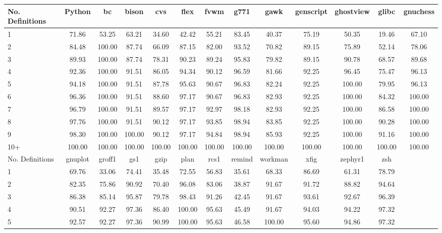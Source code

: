 \begin{tabular}{|l|c|c|c|c|c|c|c|c|c|c|c|c|}\hline
No. Definitions & Python & bc & bison & cvs & flex & fvwm & g771 & gawk & genscript & ghostview & glibc & gnuchess\\\hline\hline
1  & 71.86 & 53.25 & 63.21 & 34.60 & 42.42 & 55.21 & 83.45 & 40.37 & 75.19 & 50.35 & 19.46 & 67.10\\\hline
2  & 84.48 & 100.00 & 87.74 & 66.09 & 87.15 & 82.00 & 93.52 & 70.82 & 89.15 & 75.89 & 52.14 & 78.06\\\hline
3  & 89.93 & 100.00 & 87.74 & 78.31 & 90.23 & 89.24 & 95.83 & 79.82 & 89.15 & 90.78 & 68.57 & 89.68\\\hline
4  & 92.36 & 100.00 & 91.51 & 86.05 & 94.34 & 90.12 & 96.59 & 81.66 & 92.25 & 96.45 & 75.47 & 96.13\\\hline
5  & 94.18 & 100.00 & 91.51 & 87.78 & 95.63 & 90.67 & 96.83 & 82.24 & 92.25 & 100.00 & 79.95 & 96.13\\\hline
6  & 96.36 & 100.00 & 91.51 & 88.60 & 97.17 & 90.67 & 96.83 & 82.93 & 92.25 & 100.00 & 84.32 & 100.00\\\hline
7  & 96.79 & 100.00 & 91.51 & 89.57 & 97.17 & 92.97 & 98.18 & 82.93 & 92.25 & 100.00 & 86.58 & 100.00\\\hline
8  & 97.76 & 100.00 & 91.51 & 90.12 & 97.17 & 93.85 & 98.94 & 83.85 & 92.25 & 100.00 & 90.28 & 100.00\\\hline
9  & 98.30 & 100.00 & 100.00 & 90.12 & 97.17 & 94.84 & 98.94 & 85.93 & 92.25 & 100.00 & 91.16 & 100.00\\\hline
10+ & 100.00 & 100.00 & 100.00 & 100.00 & 100.00 & 100.00 & 100.00 & 100.00 & 100.00 & 100.00 & 100.00 & 100.00\\\hline
\hline
No. Definitions & gnuplot & groff1 & gs1 & gzip & plan & rcs1 & remind & workman & xfig & zephyr1 & zsh\\\hline\hline
1  & 69.76 & 33.06 & 74.41 & 35.48 & 72.55 & 56.83 & 35.61 & 68.33 & 86.69 & 61.31 & 78.79\\\hline
2  & 82.35 & 75.86 & 90.92 & 70.40 & 96.08 & 83.06 & 38.87 & 91.67 & 91.72 & 88.82 & 94.64\\\hline
3  & 86.38 & 85.14 & 95.87 & 79.78 & 98.43 & 91.26 & 42.45 & 91.67 & 93.61 & 92.67 & 96.39\\\hline
4  & 90.51 & 92.27 & 97.36 & 86.40 & 100.00 & 95.63 & 45.49 & 91.67 & 94.03 & 94.22 & 97.32\\\hline
5  & 92.57 & 92.27 & 97.36 & 90.99 & 100.00 & 95.63 & 46.58 & 100.00 & 95.60 & 94.86 & 97.32\\\hline

\end{tabular}
